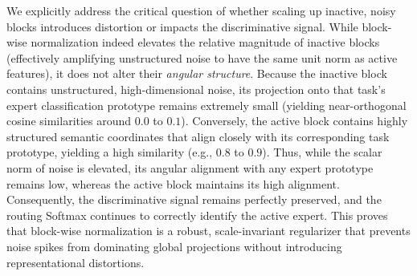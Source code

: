 \documentclass{article}
\theoremstyle{plain}
\theoremstyle{definition}
\theoremstyle{remark}
\begin{document}
We explicitly address the critical question of whether scaling up inactive, noisy blocks introduces distortion or impacts the discriminative signal. While block-wise normalization indeed elevates the relative magnitude of inactive blocks (effectively amplifying unstructured noise to have the same unit norm as active features), it does not alter their \emph{angular structure}. Because the inactive block contains unstructured, high-dimensional noise, its projection onto that task's expert classification prototype remains extremely small (yielding near-orthogonal cosine similarities around $0.0$ to $0.1$). Conversely, the active block contains highly structured semantic coordinates that align closely with its corresponding task prototype, yielding a high similarity (e.g., $0.8$ to $0.9$). Thus, while the scalar norm of noise is elevated, its angular alignment with any expert prototype remains low, whereas the active block maintains its high alignment. Consequently, the discriminative signal remains perfectly preserved, and the routing Softmax continues to correctly identify the active expert. This proves that block-wise normalization is a robust, scale-invariant regularizer that prevents noise spikes from dominating global projections without introducing representational distortions.
\end{document}
